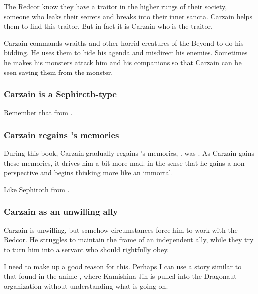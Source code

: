 The Redcor know they have a traitor in the higher rungs of their society, someone who leaks their secrets and breaks into their inner sancta. 
Carzain helps them to find this traitor.
But in fact it is Carzain who is the traitor. 

Carzain commands wraiths and other horrid creatures of the Beyond to do his bidding.
He uses them to hide his agenda and misdirect his enemies.
Sometimes he makes his monsters attack him and his companions so that Carzain can be seen saving them from the monster.





\subsubsection{Carzain is a Sephiroth-type}
Remember that  from \cite{VideoGame:FinalFantasyVII}. 





\subsubsection{Carzain regains \Tydesmos's memories}
During this book, Carzain gradually regains \Tydesmos's memories, . 
\Tydesmos was .
As Carzain gains these memories, it drives him a bit more mad. 
 in the sense that he gains a non-\human perspective and begins thinking more like an immortal. 

Like Sephiroth from \cite{VideoGame:FinalFantasyVII}. 





\subsubsection{Carzain as an unwilling ally}
Carzain is unwilling, but somehow circumstances force him to work with the Redcor. 
He struggles to maintain the frame of an independent ally, while they try to turn him into a servant who should rightfully obey. 

I need to make up a good reason for this. 
Perhaps I can use a story similar to that found in the anime \cite{Anime:Dragonaut}, where Kamishina Jin is pulled into the Dragonaut organization without understanding what is going on. 

